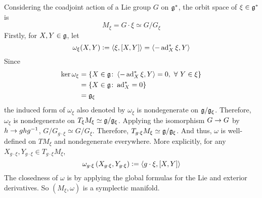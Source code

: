 \documentclass[a4paper,12pt]{article}
\begin{document}
	\begin{exam}
		Considering the coadjoint action of a Lie group $G$ on $\mathfrak{g}^*$, the orbit space of $\xi \in \mathfrak{g}^*$ is
		\begin{equation*}
			M_{\xi} = G \cdot \xi \simeq G / G_{\xi}
		\end{equation*}
		Firstly, for $X,Y \in \mathfrak{g}$, let
		\begin{equation*}
			\omega_{\xi}(X,Y) \vcentcolon= \left\langle \xi,[X,Y] \right\rangle = \left\langle -\operatorname{ad}^{*}_X \xi, Y \right\rangle
		\end{equation*}
		Since
		\begin{equation*}
			\begin{split}
				\ker \omega_{\xi} &= \left\{X \in \mathfrak{g} \colon \left\langle -\operatorname{ad}^{*}_X \xi, Y \right\rangle = 0,~\forall~Y \in \xi\right\} \\
				&= \left\{X \in \mathfrak{g} \colon \operatorname{ad}^{*}_X = 0\right\} \\
				&= \mathfrak{g}_{\xi} 
			\end{split}
		\end{equation*}
		the induced form of $\omega_{\xi}$ also denoted by $\omega_{\xi}$ is nondegenerate on $\mathfrak{g}/\mathfrak{g}_{\xi}$. Therefore, $\omega_{\xi}$ is nondegenerate on $T_{\xi}M_{\xi} \simeq \mathfrak{g}/\mathfrak{g}_{\xi}$. Applying the isomorphism $G \rightarrow G$ by $h \rightarrow ghg^{-1}$, $G/G_{g\cdot \xi} \simeq G / G_{\xi}$. Therefore, $T_{g \cdot \xi}M_{\xi} \simeq \mathfrak{g}/\mathfrak{g}_{\xi}$. And thus, $\omega$ is well-defined on $TM_{\xi}$ and nondegenerate everywhere. More explicitly, for any $X_{g \cdot \xi},Y_{g \cdot \xi} \in T_{g \cdot \xi}M_{\xi}$,
		\begin{equation*}
			\omega_{g \cdot \xi}\left(X_{g \cdot \xi},Y_{g \cdot \xi}\right) \vcentcolon= \left\langle g\cdot \xi,[X,Y] \right\rangle
		\end{equation*}
		The closedness of $\omega$ is by applying the global formulas for the Lie and exterior derivatives. So $(M_{\xi},\omega)$ is a symplectic manifold.
	\end{exam}
\end{document}
